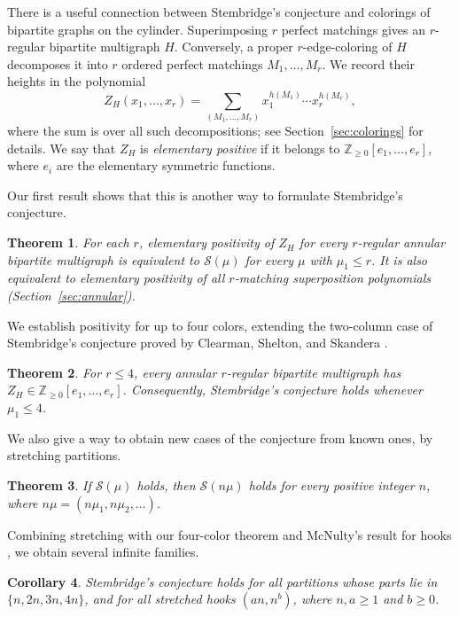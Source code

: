 \documentclass[11pt]{article}
\newtheorem{theorem}{Theorem}[section]
\newtheorem{corollary}[theorem]{Corollary}
\theoremstyle{definition}
\theoremstyle{remark}
\newcommand{\NN}{\mathbb Z_{\ge0}}
\begin{document}
There is a useful connection between Stembridge's conjecture
and colorings of bipartite graphs on the cylinder.
Superimposing $r$ perfect matchings gives an $r$-regular
bipartite multigraph $H$. Conversely, a proper
$r$-edge-coloring of $H$ decomposes it into $r$ ordered
perfect matchings $M_1,\ldots,M_r$.
We record their heights in the polynomial
\[
Z_H(x_1,\ldots,x_r)
=\sum_{(M_1,\ldots,M_r)}
x_1^{h(M_1)}\cdots x_r^{h(M_r)},
\]
where the sum is over all such decompositions; see
Section~\ref{sec:colorings} for details.
We say that $Z_H$ is \emph{elementary positive} if it
belongs to $\NN[e_1,\ldots,e_r]$, where $e_i$ are
the elementary symmetric functions.

Our first result shows that this is another way
to formulate Stembridge's conjecture.

\begin{theorem}\label{thm:dictionary-intro}
For each $r$, elementary positivity of $Z_H$ for every
$r$-regular annular bipartite multigraph is equivalent
to $\mathcal S(\mu)$ for every $\mu$ with $\mu_1\le r$.
It is also equivalent to elementary positivity of all
$r$-matching superposition polynomials
(Section~\ref{sec:annular}).
\end{theorem}


We establish positivity for up to four colors, extending
the two-column case of Stembridge's conjecture proved
by Clearman, Shelton, and Skandera \cite{CSS}.


\begin{theorem}\label{thm:fourcolumns-intro}
For $r\le4$, every annular $r$-regular bipartite
multigraph has $Z_H\in\NN[e_1,\ldots,e_r]$.
Consequently, Stembridge's conjecture holds
whenever $\mu_1\le4$.
\end{theorem}

We also give a way to obtain new cases of the
conjecture from known ones, by stretching partitions.

\begin{theorem}\label{thm:stretching-intro}
If $\mathcal S(\mu)$ holds, then $\mathcal S(n\mu)$
holds for every positive integer $n$, where
$n\mu=(n\mu_1,n\mu_2,\ldots)$.
\end{theorem}


Combining stretching with our four-color theorem and
McNulty's result for hooks \cite{McNulty}, we obtain
several infinite families.

\begin{corollary}\label{cor:families-intro}
Stembridge's conjecture holds for all partitions whose
parts lie in $\{n,2n,3n,4n\}$, and for all stretched
hooks $(an,n^b)$, where $n,a\ge1$ and $b\ge0$.
\end{corollary}
\end{document}
